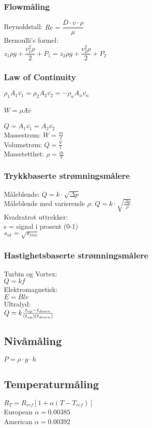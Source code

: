 \subsubsection*{Flowmåling}
\vskip 2.5pt 
\vskip 2.5pt 
\vskip 2.5pt 
Reynoldstall: $Re=\dfrac {D \cdot v \cdot \rho}{\mu}$\\
\vskip 2.5pt 
Bernoulli's formel:\\
$z_1 \rho g + \dfrac{v_1^2 \rho}{2} + P_1 = z_2 \rho g + \dfrac{v_2^2 \rho}{2} + P_2$\\
\vskip 2.5pt 
\subsubsection*{Law of Continuity}
$\rho_1 A_1 \overline{v_1} = \rho_2 A_2 \overline{v_2} = \cdots \rho_n A_n \overline{v_n}$\\
\\
$W = \rho A \overline{v}$\\\\
$Q=A_1 \overline{v_1} = A_2 \overline{v_2}$\\

Massestrøm: $W=\frac{m}{t}$\\
\vskip 2.5pt 
Volumstrøm: $Q=\frac{V}{t}$\\
\vskip 2.5pt 
Massetetthet: $\rho=\frac{m}{V}$\\
\vskip 2.5pt 
\subsubsection*{Trykkbaserte strømningsmålere}
Måleblende: $Q=k\cdot \sqrt{\Delta p}$\\
\vskip 2.5pt 
Måleblende med varierende $\rho$: $Q=k\cdot \sqrt{\frac{\Delta p}{\rho}}$\\
\vskip 2.5pt
Kvadratrot uttrekker:\\
s = signal i prosent (0-1)\\
$s_{ut}=\sqrt{s_{inn}}$\\
\subsubsection*{Hastighetsbaserte strømningsmålere}
Turbin og Vortex:\\
$Q=kf$\\
Elektromagnetisk:\\
$E=Blv$\\
Ultralyd:\\
$Q = k {t_{up} - t_{down} \over (t_{up})(t_{down})}$\\
 
\subsection{Nivåmåling}

$P = \rho \cdot g \cdot h $\\
\subsection{Temperaturmåling}
$R_T = R_{ref}[1 + \alpha(T - T_{ref})]$\\
European $\alpha=0.00385$\\
American $\alpha=0.00392$\\
\vfil \eject
